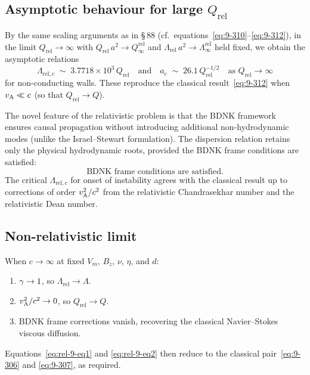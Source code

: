 \subsection{Asymptotic behaviour for large $Q_{\mathrm{rel}}$}

By the same scaling arguments as in \S\,88 (cf.\
equations~\eqref{eq:9-310}--\eqref{eq:9-312}), in the limit
$Q_{\mathrm{rel}} \to \infty$ with $Q_{\mathrm{rel}}\,a^{2} \to
Q_{\infty}^{\mathrm{rel}}$ and
$\Lambda_{\mathrm{rel}}\,a^{2} \to \Lambda_{\infty}^{\mathrm{rel}}$
held fixed, we obtain the asymptotic relations
\begin{equation}\label{eq:rel-9-asymptotic}
  \Lambda_{\mathrm{rel},c}
  \;\sim\; 3.7718 \times 10^{3}\,Q_{\mathrm{rel}}
  \quad \text{and} \quad
  a_{c} \;\sim\; 26.1\,Q_{\mathrm{rel}}^{-1/2}
  \quad \text{as } Q_{\mathrm{rel}} \to \infty
\end{equation}
for non-conducting walls.  These reproduce the classical
result~\eqref{eq:9-312} when $v_{\mathrm{A}} \ll c$ (so that
$Q_{\mathrm{rel}} \to Q$).

The novel feature of the relativistic problem is that the BDNK
framework ensures causal propagation without introducing additional
non-hydrodynamic modes (unlike the Israel--Stewart formulation).  The
dispersion relation retains only the physical hydrodynamic roots,
provided the BDNK frame conditions are satisfied:
\begin{equation}\label{eq:rel-9-causality-cond}
  \text{BDNK frame conditions are satisfied.}
\end{equation}
The critical $\Lambda_{\mathrm{rel},c}$ for onset of instability
agrees with the classical result up to corrections of order
$v_{\mathrm{A}}^{2}/c^{2}$ from the relativistic Chandrasekhar number
and the relativistic Dean number.

\subsection{Non-relativistic limit}

When $c \to \infty$ at fixed $V_{m}$, $B_{z}$, $\nu$, $\eta$, and $d$:
\begin{enumerate}
  \item $\gamma \to 1$, so $\Lambda_{\mathrm{rel}} \to \Lambda$.
  \item $v_{\mathrm{A}}^{2}/c^{2} \to 0$, so $Q_{\mathrm{rel}} \to Q$.
  \item BDNK frame corrections vanish, recovering the
        classical Navier--Stokes viscous diffusion.
\end{enumerate}
Equations~\eqref{eq:rel-9-eq1} and \eqref{eq:rel-9-eq2} then reduce
to the classical pair~\eqref{eq:9-306} and \eqref{eq:9-307}, as
required.

